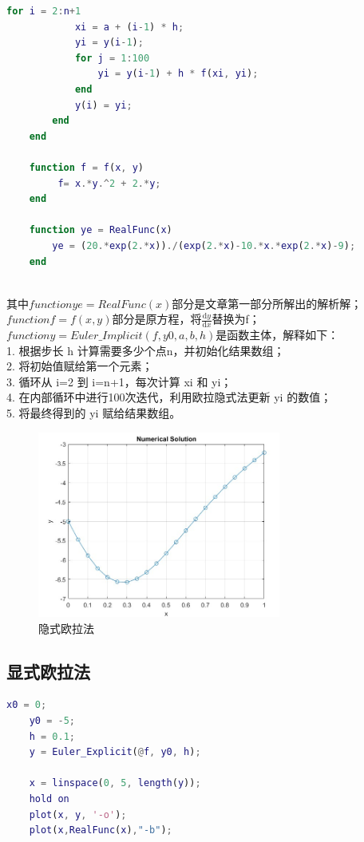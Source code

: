\documentclass[12pt, a4paper, oneside]{ctexart}
\begin{document}
\begin{spacing}{2.0}
\begin{lstlisting}[language=MATLAB, caption=隐式欧拉法]
        for i = 2:n+1
            xi = a + (i-1) * h;
            yi = y(i-1);
            for j = 1:100
                yi = y(i-1) + h * f(xi, yi);
            end
            y(i) = yi;
        end
    end
    
    function f = f(x, y)
         f= x.*y.^2 + 2.*y;
    end
    
    function ye = RealFunc(x)
        ye = (20.*exp(2.*x))./(exp(2.*x)-10.*x.*exp(2.*x)-9);
    end
    
\end{lstlisting}
其中$function ye = RealFunc(x)$部分是文章第一部分所解出的解析解；$function f = f(x, y)$部分是原方程，将$\frac{\mathrm{d}y}{\mathrm{d}x}$替换为f；
$function y = Euler\_Implicit(f, y0, a, b, h)$是函数主体，解释如下：\\
1. 根据步长 h 计算需要多少个点n，并初始化结果数组；\\
2. 将初始值赋给第一个元素；\\
3. 循环从 i=2 到 i=n+1，每次计算 xi 和 yi；\\
4. 在内部循环中进行100次迭代，利用欧拉隐式法更新 yi 的数值；\\
5. 将最终得到的 yi 赋给结果数组。\\
\begin{figure}[htbp][H]
    \centering
    \includegraphics[width=8cm]{Eular-IM.jpg}
    \caption{隐式欧拉法}
\end{figure}

\subsection{显式欧拉法}
\begin{lstlisting}[language=MATLAB, caption=显式欧拉法]
    x0 = 0;
    y0 = -5;
    h = 0.1;
    y = Euler_Explicit(@f, y0, h);
    
    x = linspace(0, 5, length(y));
    hold on
    plot(x, y, '-o');
    plot(x,RealFunc(x),"-b");
    

\end{lstlisting}
\end{spacing}
\end{document}
